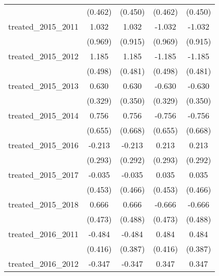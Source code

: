{\begin{tabular}{l*{4}{c}}
            &     (0.462)         &     (0.450)         &     (0.462)         &     (0.450)         \\
[1em]
treated\_2015\_2011&       1.032         &       1.032         &      -1.032         &      -1.032         \\
            &     (0.969)         &     (0.915)         &     (0.969)         &     (0.915)         \\
[1em]
treated\_2015\_2012&       1.185\sym{*}  &       1.185\sym{*}  &      -1.185\sym{*}  &      -1.185\sym{*}  \\
            &     (0.498)         &     (0.481)         &     (0.498)         &     (0.481)         \\
[1em]
treated\_2015\_2013&       0.630         &       0.630         &      -0.630         &      -0.630         \\
            &     (0.329)         &     (0.350)         &     (0.329)         &     (0.350)         \\
[1em]
treated\_2015\_2014&       0.756         &       0.756         &      -0.756         &      -0.756         \\
            &     (0.655)         &     (0.668)         &     (0.655)         &     (0.668)         \\
[1em]
treated\_2015\_2016&      -0.213         &      -0.213         &       0.213         &       0.213         \\
            &     (0.293)         &     (0.292)         &     (0.293)         &     (0.292)         \\
[1em]
treated\_2015\_2017&      -0.035         &      -0.035         &       0.035         &       0.035         \\
            &     (0.453)         &     (0.466)         &     (0.453)         &     (0.466)         \\
[1em]
treated\_2015\_2018&       0.666         &       0.666         &      -0.666         &      -0.666         \\
            &     (0.473)         &     (0.488)         &     (0.473)         &     (0.488)         \\
[1em]
treated\_2016\_2011&      -0.484         &      -0.484         &       0.484         &       0.484         \\
            &     (0.416)         &     (0.387)         &     (0.416)         &     (0.387)         \\
[1em]
treated\_2016\_2012&      -0.347         &      -0.347         &       0.347         &       0.347         \\

\end{tabular}}
